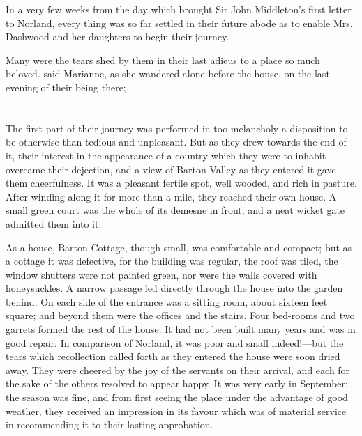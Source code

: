 In a very few weeks from the day which brought Sir John Middleton's first letter to Norland, every thing was so far settled in their future abode as to enable Mrs. Dashwood and her daughters to begin their journey.

Many were the tears shed by them in their last adieus to a place so much beloved.  said Marianne, as she wandered alone before the house, on the last evening of their being there; 

\chapter{} %

The first part of their journey was performed in too melancholy a disposition to be otherwise than tedious and unpleasant. But as they drew towards the end of it, their interest in the appearance of a country which they were to inhabit overcame their dejection, and a view of Barton Valley as they entered it gave them cheerfulness. It was a pleasant fertile spot, well wooded, and rich in pasture. After winding along it for more than a mile, they reached their own house. A small green court was the whole of its demesne in front; and a neat wicket gate admitted them into it.

As a house, Barton Cottage, though small, was comfortable and compact; but as a cottage it was defective, for the building was regular, the roof was tiled, the window shutters were not painted green, nor were the walls covered with honeysuckles. A narrow passage led directly through the house into the garden behind. On each side of the entrance was a sitting room, about sixteen feet square; and beyond them were the offices and the stairs. Four bed-rooms and two garrets formed the rest of the house. It had not been built many years and was in good repair. In comparison of Norland, it was poor and small indeed!---but the tears which recollection called forth as they entered the house were soon dried away. They were cheered by the joy of the servants on their arrival, and each for the sake of the others resolved to appear happy. It was very early in September; the season was fine, and from first seeing the place under the advantage of good weather, they received an impression in its favour which was of material service in recommending it to their lasting approbation.

